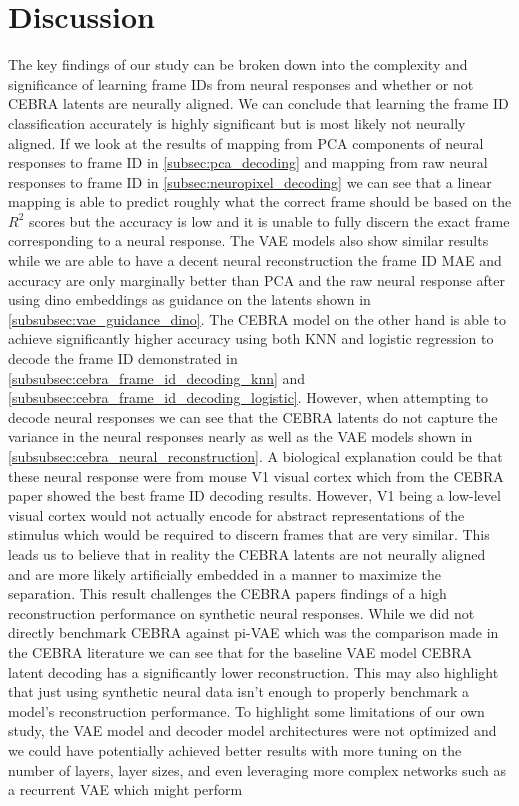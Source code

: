 \documentclass[12pt, letterpaper]{article}
\begin{document}
\section{Discussion}
\label{sec:discussion}
The key findings of our study can be broken down into the complexity and significance of learning frame IDs from neural responses and whether or not CEBRA latents are neurally aligned. We can conclude that learning the frame ID classification accurately is highly significant but is most likely not neurally aligned. If we look at the results of mapping from PCA components of neural responses to frame ID in \hyperref[subsec:pca_decoding]{\ref{subsec:pca_decoding}} and mapping from raw neural responses to frame ID in \hyperref[subsec:neuropixel_decoding]{\ref{subsec:neuropixel_decoding}} we can see that a linear mapping is able to predict roughly what the correct frame should be based on the $R^2$ scores but the accuracy is low and it is unable to fully discern the exact frame corresponding to a neural response. The VAE models also show similar results while we are able to have a decent neural reconstruction the frame ID MAE and accuracy are only marginally better than PCA and the raw neural response after using dino embeddings as guidance on the latents shown in \hyperref[subsubsec:vae_guidance_dino]{\ref{subsubsec:vae_guidance_dino}}. The CEBRA model on the other hand is able to achieve significantly higher accuracy using both KNN and logistic regression to decode the frame ID demonstrated in \hyperref[subsubsec:cebra_frame_id_decoding_knn]{\ref{subsubsec:cebra_frame_id_decoding_knn}} and \hyperref[subsubsec:cebra_frame_id_decoding_logistic]{\ref{subsubsec:cebra_frame_id_decoding_logistic}}. However, when attempting to decode neural responses we can see that the CEBRA latents do not capture the variance in the neural responses nearly as well as the VAE models shown in \hyperref[subsubsec:cebra_neural_reconstruction]{\ref{subsubsec:cebra_neural_reconstruction}}. A biological explanation could be that these neural response were from mouse V1 visual cortex which from the CEBRA paper showed the best frame ID decoding results. However, V1 being a low-level visual cortex would not actually encode for abstract representations of the stimulus which would be required to discern frames that are very similar. This leads us to believe that in reality the CEBRA latents are not neurally aligned and are more likely artificially embedded in a manner to maximize the separation. This result challenges the CEBRA papers findings of a high reconstruction performance on synthetic neural responses. While we did not directly benchmark CEBRA against pi-VAE which was the comparison made in the CEBRA literature we can see that for the baseline VAE model CEBRA latent decoding has a significantly lower reconstruction. This may also highlight that just using synthetic neural data isn't enough to properly benchmark a model's reconstruction performance. To highlight some limitations of our own study, the VAE model and decoder model architectures were not optimized and we could have potentially achieved better results with more tuning on the number of layers, layer sizes, and even leveraging more complex networks such as a recurrent VAE which might perform 
\end{document}

